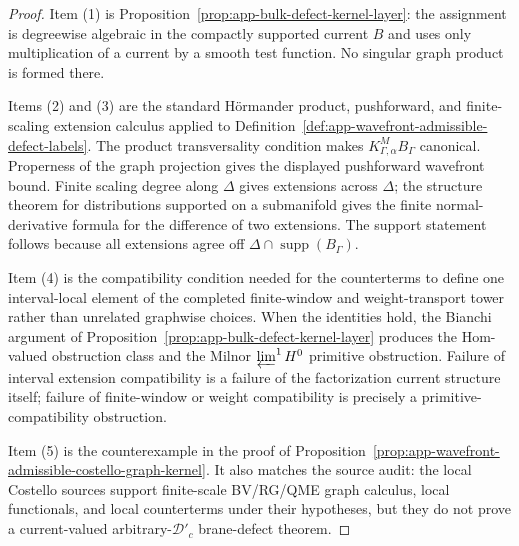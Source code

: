 \begin{proof}
  Item (1) is
  Proposition~\ref{prop:app-bulk-defect-kernel-layer}: the assignment is
  degreewise algebraic in the compactly supported current \(B\) and uses
  only multiplication of a current by a smooth test function.  No
  singular graph product is formed there.

  Items (2) and (3) are the standard H\"ormander product, pushforward,
  and finite-scaling extension calculus applied to
  Definition~\ref{def:app-wavefront-admissible-defect-labels}.  The
  product transversality condition makes
  \(K^M_{\Gamma,\alpha}B_\Gamma\) canonical.  Properness of the graph
  projection gives the displayed pushforward wavefront bound.  Finite
  scaling degree along \(\Delta\) gives extensions across \(\Delta\);
  the structure theorem for distributions supported on a submanifold
  gives the finite normal-derivative formula for the difference of two
  extensions.  The support statement follows because all extensions
  agree off
  \(\Delta\cap\operatorname{supp}(B_\Gamma)\).

  Item (4) is the compatibility condition needed for the counterterms to
  define one interval-local element of the completed finite-window and
  weight-transport tower rather than unrelated graphwise choices.  When
  the identities hold, the Bianchi argument of
  Proposition~\ref{prop:app-bulk-defect-kernel-layer} produces the
  Hom-valued obstruction class and the Milnor
  \(\varprojlim^1H^0\) primitive obstruction.  Failure of interval
  extension compatibility is a failure of the factorization current
  structure itself; failure of finite-window or weight compatibility is
  precisely a primitive-compatibility obstruction.

  Item (5) is the counterexample in the proof of
  Proposition~\ref{prop:app-wavefront-admissible-costello-graph-kernel}.
  It also matches the source audit: the local Costello sources support
  finite-scale BV/RG/QME graph calculus, local functionals, and local
  counterterms under their hypotheses, but they do not prove a
  current-valued arbitrary-\(\mathcal D'_c\) brane-defect theorem.
\end{proof}

